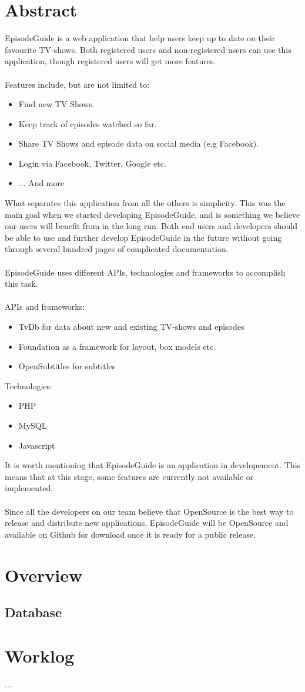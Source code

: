 \documentclass[12pt]{article}
\begin{document}


\tableofcontents

\section{Abstract}
EpisodeGuide is a web application that help users keep up to date on their favourite TV-shows. Both registered users and non-registered users can use this application, though registered users will get more features.
\\\\
Features include, but are not limited to:
\begin{itemize}
  \item Find new TV Shows.
  \item Keep track of episodes watched so far.
  \item Share TV Shows and episode data on social media (e.g Facebook).
  \item Login via Facebook, Twitter, Google etc.
  \item ... And more
\end{itemize}
What separates this application from all the others is simplicity. This was the main goal when we started developing EpisodeGuide, and is something we believe our users will benefit from in the long run.
Both end users and developers should be able to use and further develop EpisodeGuide in the future without going through several hundred pages of complicated documentation.
\\\\
EpisodeGuide uses different APIs, technologies and frameworks to accomplish this task.\\\\
APIs and frameworks:
\begin{itemize}
  \item TvDb for data about new and existing TV-shows and episodes
  \item Foundation as a framework for layout, box models etc.
  \item OpenSubtitles for subtitles
\end{itemize}
Technologies:
\begin{itemize}
  \item PHP
  \item MySQL
  \item Javascript
\end{itemize}
It is worth mentioning that EpisodeGuide is an application in developement. This means that at this stage, some features are currently not available or implemented.\\
\\
Since all the developers on our team believe that OpenSource is the best way to release and distribute new applications, EpisodeGuide will be OpenSource and available on Github for download once it is ready for a public release.
\section{Overview}
\subsection{Database}

\section{Worklog}


...
\end{document}
